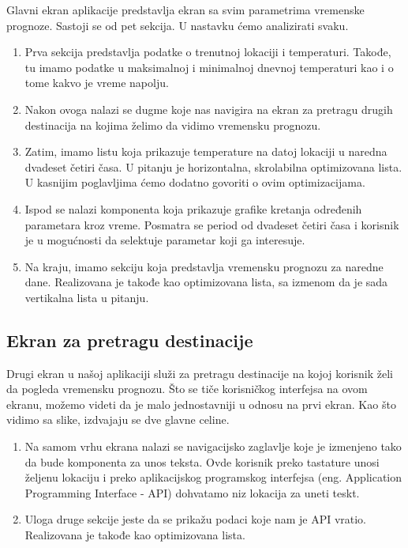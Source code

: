 \documentclass[12pt,oneside]{memoir}
\begin{document}
Glavni ekran aplikacije predstavlja ekran sa svim parametrima vremenske prognoze. Sastoji se od pet sekcija. U nastavku ćemo analizirati svaku.

\begin{enumerate}
    \item Prva sekcija predstavlja podatke o trenutnoj lokaciji i temperaturi. Takođe, tu imamo podatke u maksimalnoj i minimalnoj dnevnoj temperaturi kao i o tome kakvo je vreme napolju.
    \item Nakon ovoga nalazi se dugme koje nas navigira na ekran za pretragu drugih destinacija na kojima želimo da vidimo vremensku prognozu.
    \item Zatim, imamo listu koja prikazuje temperature na datoj lokaciji u naredna dvadeset četiri časa. U pitanju je horizontalna, skrolabilna optimizovana lista. U kasnijim poglavljima ćemo dodatno govoriti o ovim optimizacijama.
    \item Ispod se nalazi komponenta koja prikazuje grafike kretanja određenih parametara kroz vreme. Posmatra se period od dvadeset četiri časa i korisnik je u mogućnosti da selektuje parametar koji ga interesuje.
    \item Na kraju, imamo sekciju koja predstavlja vremensku prognozu za naredne dane. Realizovana je takođe kao optimizovana lista, sa izmenom da je sada vertikalna lista u pitanju.
\end{enumerate}

\subsection{Ekran za pretragu destinacije}

Drugi ekran u našoj aplikaciji služi za pretragu destinacije na kojoj korisnik želi da pogleda vremensku prognozu. Što se tiče korisničkog interfejsa na ovom ekranu, možemo videti da je malo jednostavniji u odnosu na prvi ekran. Kao što vidimo sa slike, izdvajaju se dve glavne celine.

\begin{enumerate}
    \item Na samom vrhu ekrana nalazi se navigacijsko zaglavlje koje je izmenjeno tako da bude komponenta za unos teksta. Ovde korisnik preko tastature unosi željenu lokaciju i preko aplikacijskog programskog interfejsa (eng. Application Programming Interface - API) dohvatamo niz lokacija za uneti teskt.
    \item Uloga druge sekcije jeste da se prikažu podaci koje nam je API vratio. Realizovana je takođe kao optimizovana lista.
\end{enumerate}
\end{document}
